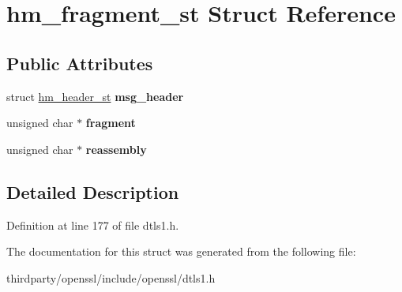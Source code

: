 \hypertarget{structhm__fragment__st}{}\section{hm\+\_\+fragment\+\_\+st Struct Reference}
\label{structhm__fragment__st}
\subsection*{Public Attributes}
\begin{DoxyCompactItemize}
\item 
\mbox{\label{structhm__fragment__st_a171c5cb6c7c15bdf7c6401d022247729}} 
struct \hyperlink{structhm__header__st}{hm\+\_\+header\+\_\+st} {\bfseries msg\+\_\+header}
\item 
\mbox{\label{structhm__fragment__st_ab36bd817673b28cc64b927b62faf7225}} 
unsigned char $\ast$ {\bfseries fragment}
\item 
\mbox{\label{structhm__fragment__st_a50a13bdc9997bc66cb7c578519413510}} 
unsigned char $\ast$ {\bfseries reassembly}
\end{DoxyCompactItemize}


\subsection{Detailed Description}


Definition at line 177 of file dtls1.\+h.



The documentation for this struct was generated from the following file\+:\begin{DoxyCompactItemize}
\item 
thirdparty/openssl/include/openssl/dtls1.\+h\end{DoxyCompactItemize}
